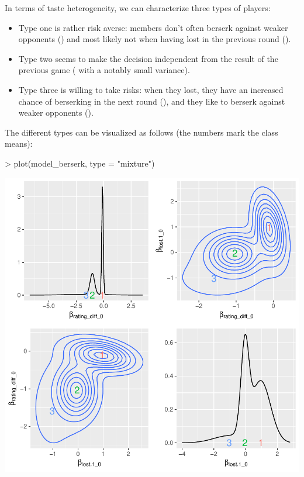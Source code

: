 \documentclass[article,shortnames]{jss}
\begin{document}
\newpage

In terms of taste heterogeneity, we can characterize three types of players:

\begin{itemize}
  \item Type one is rather risk averse: members don't often berserk against weaker opponents () and most likely not when having lost in the previous round ().
  \item Type two seems to make the decision independent from the result of the previous game ( with a notably small variance).
  \item Type three is willing to take risks: when they lost, they have an increased chance of berserking in the next round (), and they like to berserk against weaker opponents ().
\end{itemize}

The different types can be visualized as follows (the numbers mark the class means):

\begin{Schunk}
\begin{Sinput}
> plot(model_berserk, type = "mixture")
\end{Sinput}
\end{Schunk}
\includegraphics{rprobitb_oelschlaeger_bauer-model-berserk-mixture}
\end{document}
